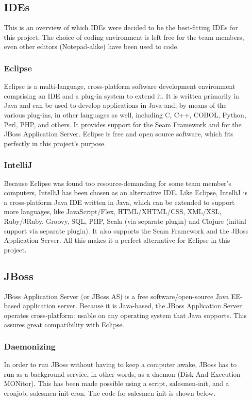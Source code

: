 \subsection{IDEs}
This is an overview of which IDEs were decided to be the best-fitting IDEs for this project. The choice of coding environment is left free for the team members, even other editors (Notepad-alike) have been used to code.
\subsubsection{Eclipse}
Eclipse is a multi-language, cross-platform software development environment comprising an IDE and a plug-in system to extend it.
It is written primarily in Java and can be used to develop applications in Java and, by means of the various plug-ins, in other languages as well, including C, C++, COBOL, Python, Perl, PHP, and others.
It provides support for the Seam Framework and for the JBoss Application Server.
Eclipse is free and open source software, which fits perfectly in this project's purpose.
\subsubsection{IntelliJ}
Because Eclipse was found too resource-demanding for some team member's computers, IntelliJ has been chosen as an alternative IDE.
Like Eclipse, IntelliJ is a cross-platform Java IDE written in Java, which can be extended to support more languages, like JavaScript/Flex, HTML/XHTML/CSS, XML/XSL, Ruby/JRuby, Groovy, SQL, PHP, Scala (via separate plugin) and Clojure (initial support via separate plugin).
It also supports the Seam Framework and the JBoss Application Server.
All this makes it a perfect alternative for Eclipse in this project.

\subsection{JBoss}
JBoss Application Server (or JBoss AS) is a free software/open-source Java EE-based application server.
Because it is Java-based, the JBoss Application Server operates cross-platform: usable on any operating system that Java supports.
This assures great compatibility with Eclipse.
\subsubsection{Daemonizing}
In order to run JBoss without having to keep a computer awake, JBoss has to run as a background service, in other words, as a daemon (Disk And Execution MONitor). This has been made possible using a script, salesmen-init, and a cronjob, salesmen-init-cron. The code for salesmen-init is shown below.


